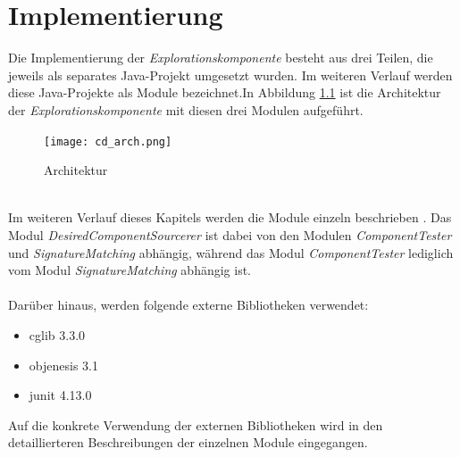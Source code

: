 \chapter{Implementierung}\label{chap_impl}
Die Implementierung der \emph{Explorationskomponente} besteht aus drei Teilen, die jeweils als separates Java-Projekt umgesetzt wurden. Im weiteren Verlauf werden diese Java-Projekte als \Gls{Modul}e bezeichnet.In Abbildung \ref{cd_arch} ist die Architektur der \emph{Explorationskomponente} mit diesen drei \Gls{Modul}en aufgeführt.
\begin{figure}[h!]
\centering
\texttt{[image: cd\_arch.png]}
\caption{Architektur}
\label{cd_arch}
\end{figure}
\noindent
\\
Im weiteren Verlauf dieses Kapitels werden die \Gls{Modul}e einzeln beschrieben . Das \Gls{Modul} \emph{DesiredComponentSourcerer} ist dabei von den \Gls{Modul}en \emph{ComponentTester} und \emph{SignatureMatching} abhängig, während das \Gls{Modul} \emph{ComponentTester} lediglich vom \Gls{Modul} \emph{SignatureMatching} abhängig ist.
\\\\
Darüber hinaus, werden folgende externe Bibliotheken verwendet:
\begin{itemize}
\item cglib 3.3.0 \cite{cglib}
\item objenesis 3.1 \cite{objenesis}
\item junit 4.13.0 \cite{junit}
\end{itemize}
Auf die konkrete Verwendung der externen Bibliotheken wird in den detaillierteren Beschreibungen der einzelnen \Gls{Modul}e eingegangen.
